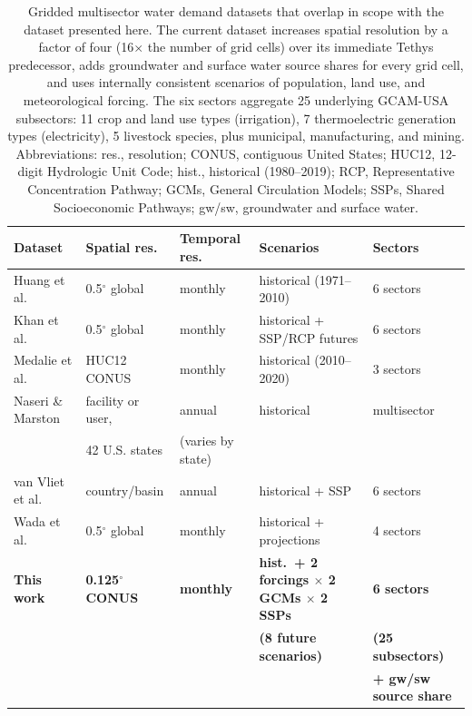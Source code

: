 \documentclass[fleqn,10pt]{wlscirep}
\begin{document}
\begin{table}[!ht]
\centering
\small
\begin{tabular}{lllll}
\toprule
\textbf{Dataset} & \textbf{Spatial res.} & \textbf{Temporal res.} & \textbf{Scenarios} & \textbf{Sectors} \\
\midrule
Huang et al.\cite{Huang2018}                   & 0.5$^{\circ}$ global & monthly & historical (1971--2010) & 6 sectors \\
Khan et al.\cite{Khan2023}                     & 0.5$^{\circ}$ global & monthly & historical + SSP/RCP futures & 6 sectors \\
Medalie et al.\cite{Stets2025USGS,Haynes2023USGS,Luukkonen2023USGS,Galanter2023USGS} & HUC12 CONUS & monthly & historical (2010--2020) & 3 sectors \\
Naseri \& Marston\cite{naseri2025united}       & facility or user, & annual & historical & multisector  \\
                                               & 42 U.S. states & (varies by state) &  &   \\
van Vliet et al.\cite{van_Vliet_2021}          & country/basin & annual & historical + SSP & 6 sectors \\
Wada et al.\cite{Wada_2017}                    & 0.5$^{\circ}$ global & monthly & historical + projections & 4 sectors \\
\textbf{This work}                             & \textbf{0.125$^{\circ}$ CONUS} & \textbf{monthly} & \textbf{hist.\ + 2 forcings $\times$ 2 GCMs $\times$ 2 SSPs} & \textbf{6 sectors} \\
                                               &                                &                  & \textbf{(8 future scenarios)}                                & \textbf{(25 subsectors)} \\
                                               &                                &                  &                                                              & \textbf{+ gw/sw source share} \\
\bottomrule
\end{tabular}
\caption{Gridded multisector water demand datasets that overlap in scope with the dataset presented here. The current dataset increases spatial resolution by a factor of four (16$\times$ the number of grid cells) over its immediate Tethys predecessor\cite{Khan2023}, adds groundwater and surface water source shares for every grid cell, and uses internally consistent scenarios of population, land use, and meteorological forcing. The six sectors aggregate 25 underlying GCAM-USA subsectors: 11 crop and land use types (irrigation), 7 thermoelectric generation types (electricity), 5 livestock species, plus municipal, manufacturing, and mining. Abbreviations: res., resolution; CONUS, contiguous United States; HUC12, 12-digit Hydrologic Unit Code; hist., historical (1980--2019); RCP, Representative Concentration Pathway; GCMs, General Circulation Models; SSPs, Shared Socioeconomic Pathways; gw/sw, groundwater and surface water.}
\label{tab:prior-datasets}
\end{table}
\end{document}
